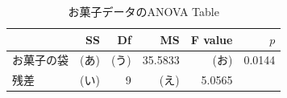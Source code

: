 \begin{table}[ht]
	\centering
	\caption{お菓子データのANOVA Table}
	\begin{tabular}{lrrrrr}
		\hline
		      & SS  & Df  & MS      & F value & $p$    \\
		\hline
		お菓子の袋 & (あ) & (う) & 35.5833 & (お)     & 0.0144 \\
		残差    & (い) & 9   & (え)     & 5.0565  &        \\
		\hline
	\end{tabular}
	\label{Example1Ans}
\end{table}
